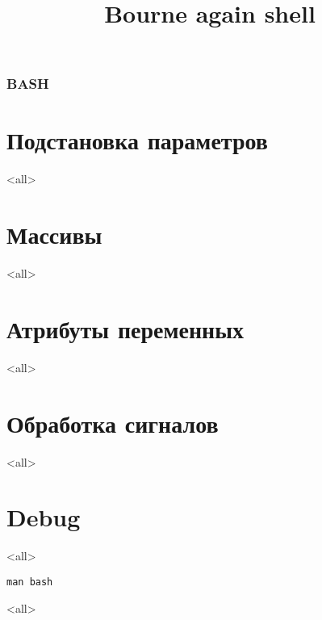 
\title[bash]{Bourne again shell}




\begin{frame}
	\frametitle{BASH}
	\titlepage
	\vspace{-0.5cm}
	\begin{center}
	\end{center}
\end{frame}

\begin{frame}
	\tableofcontents
	[hideallsubsections]
\end{frame}


\section{Подстановка параметров}

\mode<all>{}

\section{Массивы}

\mode<all>{}

\section{Атрибуты переменных}
\mode<all>{}

\section{Обработка сигналов}
\mode<all>{}

\section{Debug}
\mode<all>{}


\begin{frame}{}
\Huge
\begin{center}
	{\tt man bash}
\end{center}
\end{frame}

\mode<all>

